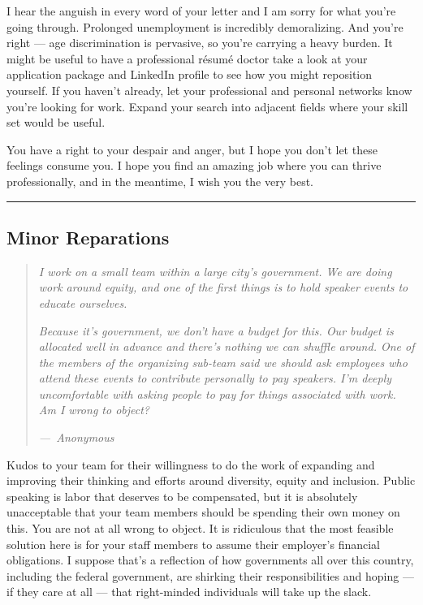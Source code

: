 I hear the anguish in every word of your letter and I am sorry for what
you're going through. Prolonged unemployment is incredibly demoralizing.
And you're right --- age discrimination is pervasive, so you're carrying
a heavy burden. It might be useful to have a professional résumé doctor
take a look at your application package and LinkedIn profile to see how
you might reposition yourself. If you haven't already, let your
professional and personal networks know you're looking for work. Expand
your search into adjacent fields where your skill set would be useful.

You have a right to your despair and anger, but I hope you don't let
these feelings consume you. I hope you find an amazing job where you can
thrive professionally, and in the meantime, I wish you the very best.

\begin{center}\rule{0.5\linewidth}{\linethickness}\end{center}

\hypertarget{minor-reparations}{%
\subsection{Minor Reparations}\label{minor-reparations}}

\begin{quote}
\emph{I work on a small team within a large city's government. We are
doing work around equity, and one of the first things is to hold speaker
events to educate ourselves.}

\emph{Because it's government, we don't have a budget for this. Our
budget is allocated well in advance and there's nothing we can shuffle
around. One of the members of the organizing sub-team said we should ask
employees who attend these events to contribute personally to pay
speakers. I'm deeply uncomfortable with asking people to pay for things
associated with work. Am I wrong to object?}

\emph{---~Anonymous}
\end{quote}

Kudos to your team for their willingness to do the work of expanding and
improving their thinking and efforts around diversity, equity and
inclusion. Public speaking is labor that deserves to be compensated, but
it is absolutely unacceptable that your team members should be spending
their own money on this. You are not at all wrong to object. It is
ridiculous that the most feasible solution here is for your staff
members to assume their employer's financial obligations. I suppose
that's a reflection of how governments all over this country, including
the federal government, are shirking their responsibilities and hoping
--- if they care at all --- that right-minded individuals will take up
the slack.

